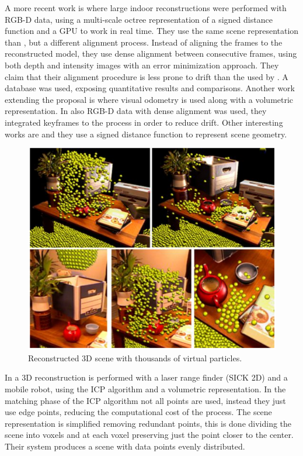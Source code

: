 A more recent work is \cite{Steinbrucker_2013_ICCV} where large indoor reconstructions were performed 
with RGB-D data, using a multi-scale octree representation of a signed distance function and a GPU to work in real time. They use 
the same scene representation than  \cite{izadi}, but a different alignment process. Instead of aligning the frames to the reconstructed 
model, they use dense alignment between consecutive frames, 
using both depth and intensity images with an error  minimization approach. They claim that their alignment procedure is less prone to drift than
 the used by \cite{izadi}. A database was used, exposing quantitative results and comparisons. Another work 
extending the \cite{izadi} proposal is \cite{Whelan13} where visual odometry is used along with a volumetric representation. In \cite{KerlSC13} also RGB-D data with dense alignment was used, they integrated keyframes to the process in order to reduce drift. Other 
interesting works are \cite{bylow-sturm-etal} and \cite{quadrocopter} they use a signed distance function to represent scene geometry. 


\begin{figure}[h]
\begin{center}
\includegraphics[scale=0.34]{images/izadi}
\caption{Reconstructed 3D scene with thousands of virtual particles.}
\label{fig:izadi}
\end{center}
\end{figure}


In \cite{keqiang} a 3D reconstruction is performed with a laser range finder (SICK 2D) and a mobile robot, 
using the ICP algorithm and a volumetric representation. In the matching phase of the ICP algorithm not all
 points are used, instead they just use edge points, reducing the computational cost of the process. The scene 
 representation is simplified removing redundant points, this is done dividing the scene into voxels and at each 
 voxel preserving just the point closer to the center. Their system produces a scene with data points evenly 
 distributed.

